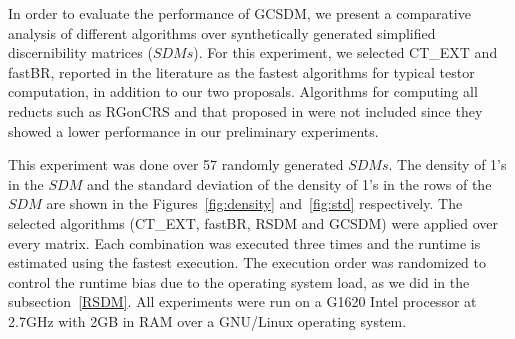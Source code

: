 \documentclass[authoryear,11pt]{elsarticle}
\begin{document}
	In order to evaluate the performance of GCSDM, we present a comparative analysis of different
	algorithms over synthetically generated simplified discernibility matrices ($SDMs$). For this experiment, we
	selected CT\_EXT and fastBR, reported in the literature as the fastest algorithms for typical testor
	computation, in addition to our two proposals. Algorithms for computing all reducts such as RGonCRS
	\citep{WangP07} and that proposed in \citep{Starzyk00} were not included since they showed a lower performance
	in our preliminary experiments. 
	
	This experiment was done over 57 randomly generated $SDMs$. The density of 1's in the $SDM$ and the standard
	deviation of the density of 1's in the rows of the $SDM$ are shown in the Figures~\ref{fig:density} 
	and~\ref{fig:std} respectively. The selected algorithms (CT\_EXT, fastBR, RSDM and GCSDM) were applied over
	every matrix. 
	Each combination was executed three times and the runtime is estimated using the fastest execution. 
	The execution order was randomized to control the runtime bias due to the operating system load, as 
	we did in the subsection~\ref{RSDM}. All experiments were run on a G1620 Intel processor at 2.7GHz with 
	2GB in RAM over a GNU/Linux operating system.
	
\end{document}

